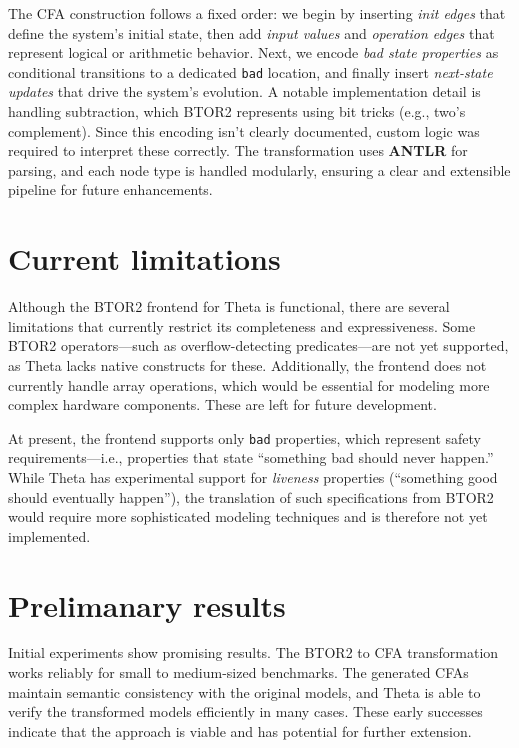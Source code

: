 The CFA construction follows a fixed order: we begin by inserting \textit{init edges} that define the system's initial state, then add \textit{input values} and \textit{operation edges} that represent logical or arithmetic behavior. Next, we encode \textit{bad state properties} as conditional transitions to a dedicated \verb*|bad| location, and finally insert \textit{next-state updates} that drive the system's evolution. A notable implementation detail is handling subtraction, which BTOR2 represents using bit tricks (e.g., two's complement). Since this encoding isn't clearly documented, custom logic was required to interpret these correctly. The transformation uses \textbf{ANTLR} for parsing, and each node type is handled modularly, ensuring a clear and extensible pipeline for future enhancements.


\section{Current limitations}
Although the BTOR2 frontend for Theta is functional, there are several limitations that currently restrict its completeness and expressiveness. Some BTOR2 operators—such as overflow-detecting predicates—are not yet supported, as Theta lacks native constructs for these. Additionally, the frontend does not currently handle array operations, which would be essential for modeling more complex hardware components. These are left for future development.

At present, the frontend supports only \texttt{bad} properties, which represent safety requirements—i.e., properties that state ``something bad should never happen.'' While Theta has experimental support for \emph{liveness} properties (``something good should eventually happen''), the translation of such specifications from BTOR2 would require more sophisticated modeling techniques and is therefore not yet implemented.
 
\section{Prelimanary results}
Initial experiments show promising results. The BTOR2 to CFA transformation works reliably for small to medium-sized benchmarks. The generated CFAs maintain semantic consistency with the original models, and Theta is able to verify the transformed models efficiently in many cases. These early successes indicate that the approach is viable and has potential for further extension.

